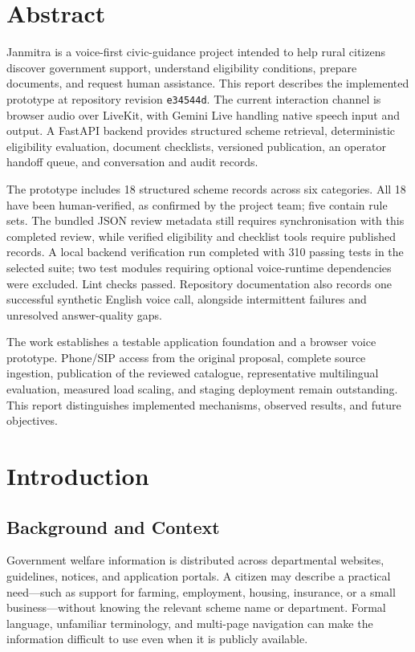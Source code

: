 \documentclass[11pt,a4paper,oneside]{report}
\newcommand{\Revision}{e34544d}
\begin{document}
\hypersetup{pageanchor=true}
\chapter*{Abstract}
Janmitra is a voice-first civic-guidance project intended to help rural citizens
discover government support, understand eligibility conditions, prepare documents,
and request human assistance. This report describes the implemented prototype at
repository revision \texttt{\Revision}. The current interaction channel is browser
audio over LiveKit, with Gemini Live handling native speech input and output.
A FastAPI backend provides structured scheme retrieval, deterministic eligibility
evaluation, document checklists, versioned publication, an operator handoff queue,
and conversation and audit records.

The prototype includes 18 structured scheme records across six categories. All
18 have been human-verified, as confirmed by the project team; five contain rule
sets. The bundled JSON review metadata still requires synchronisation with this
completed review, while verified eligibility and checklist tools require
published records. A local backend verification run
completed with 310 passing tests in the selected suite; two test
modules requiring optional voice-runtime dependencies were excluded. Lint checks
passed. Repository documentation also records one successful synthetic English
voice call, alongside intermittent failures and unresolved answer-quality gaps.

The work establishes a testable application foundation and a browser voice
prototype. Phone/SIP access from the original proposal, complete source ingestion,
publication of the reviewed catalogue, representative multilingual evaluation,
measured load scaling, and staging deployment remain outstanding. This report
distinguishes implemented mechanisms, observed results, and future objectives.

\tableofcontents
\clearpage
{}

\chapter{Introduction}

\section{Background and Context}
Government welfare information is distributed across departmental websites,
guidelines, notices, and application portals. A citizen may describe a practical
need---such as support for farming, employment, housing, insurance, or a small
business---without knowing the relevant scheme name or department. Formal
language, unfamiliar terminology, and multi-page navigation can make the
information difficult to use even when it is publicly available.
\end{document}

